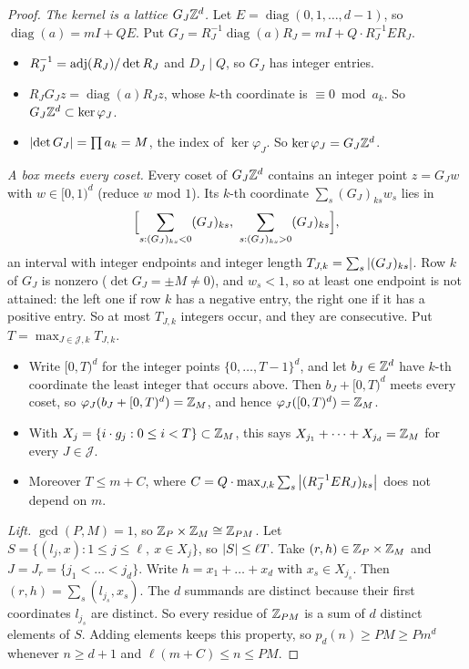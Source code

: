 \begin{proof}
\emph{The kernel is a lattice $G_J \mathbb{Z}^d$.} Let $E = \operatorname{diag}(0, 1, \dots, d-1)$, so
$\operatorname{diag}(a) = mI + QE$. Put
$G_J = R_J^{-1} \operatorname{diag}(a) R_J = mI + Q \cdot R_J^{-1} E R_J$.
\begin{itemize}
  \item $R_J^{-1} = \operatorname{adj}(R_J)/\det R_J$ and $D_J \mid Q$, so $G_J$ has integer entries.
  \item $R_J G_J z = \operatorname{diag}(a) R_J z$, whose $k$-th coordinate is $\equiv 0 \bmod a_k$.
    So $G_J \mathbb{Z}^d \subset \ker \varphi_J$.
  \item $\left|\det G_J\right| = \prod a_k = M$, the index of $\ker \varphi_J$. So
    $\ker \varphi_J = G_J \mathbb{Z}^d$.
\end{itemize}

\emph{A box meets every coset.} Every coset of $G_J \mathbb{Z}^d$ contains an integer point $z = G_J w$
with $w \in [0,1)^d$ (reduce $w$ mod $1$). Its $k$-th coordinate $\sum_s (G_J)_{ks} w_s$ lies in
\[
  \Bigl[\sum_{s : (G_J)_{ks} < 0} (G_J)_{ks},\ \sum_{s : (G_J)_{ks} > 0} (G_J)_{ks}\Bigr],
\]
an interval with integer endpoints and integer length $T_{J,k} = \sum_s \left|(G_J)_{ks}\right|$. Row $k$
of $G_J$ is nonzero ($\det G_J = \pm M \ne 0$), and $w_s < 1$, so at least one endpoint is not
attained: the left one if row $k$ has a negative entry, the right one if it has a positive entry.
So at most $T_{J,k}$ integers occur, and they are consecutive. Put
$T = \max_{J \in \mathcal{J}, k} T_{J,k}$.
\begin{itemize}
  \item Write $[0, T)^d$ for the integer points $\{0, \dots, T-1\}^d$, and let $b_J \in \mathbb{Z}^d$ have
    $k$-th coordinate the least integer that occurs above. Then $b_J + [0, T)^d$ meets every coset,
    so $\varphi_J(b_J + [0,T)^d) = \mathbb{Z}_M$, and hence $\varphi_J([0,T)^d) = \mathbb{Z}_M$.
  \item With $X_j = \{i \cdot g_j : 0 \le i < T\} \subset \mathbb{Z}_M$, this says
    $X_{j_1} + \dots + X_{j_d} = \mathbb{Z}_M$ for every $J \in \mathcal{J}$.
  \item Moreover $T \le m + C$, where
    $C = Q \cdot \max_{J,k} \sum_s \left|(R_J^{-1} E R_J)_{ks}\right|$ does not depend on $m$.
\end{itemize}

\emph{Lift.} $\gcd(P, M) = 1$, so $\mathbb{Z}_P \times \mathbb{Z}_M \cong \mathbb{Z}_{PM}$. Let
$S = \{(l_j, x) : 1 \le j \le \ell,\ x \in X_j\}$, so $\left|S\right| \le \ell T$. Take
$(r, h) \in \mathbb{Z}_P \times \mathbb{Z}_M$ and $J = J_r = \{j_1 < \dots < j_d\}$. Write
$h = x_1 + \dots + x_d$ with $x_s \in X_{j_s}$. Then $(r, h) = \sum_s (l_{j_s}, x_s)$. The $d$
summands are distinct because their first coordinates $l_{j_s}$ are distinct. So every residue of
$\mathbb{Z}_{PM}$ is a sum of $d$ distinct elements of $S$. Adding elements keeps this property, so
$p_d(n) \ge PM \ge P m^d$ whenever $n \ge d+1$ and $\ell(m + C) \le n \le PM$.


\end{proof}
